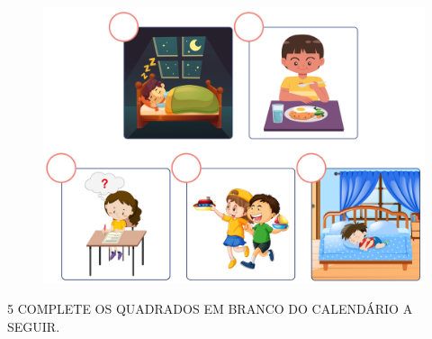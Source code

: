 
\begin{figure}[htpb!]
\centering
\includegraphics[width=\textwidth]{./media/SAEB_1ANO_MAT_FIGURA52.png}
\end{figure}


\num{5} COMPLETE OS QUADRADOS EM BRANCO DO CALENDÁRIO A SEGUIR.


